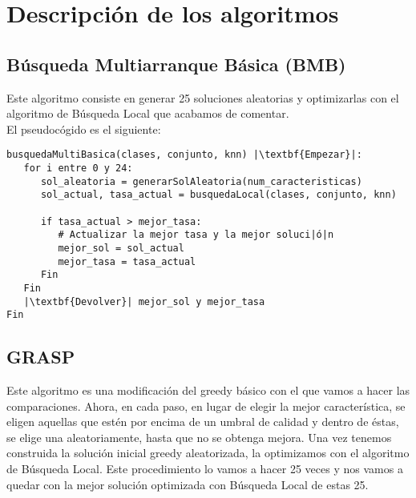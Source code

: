 \documentclass[12pt]{article}
\begin{document}
\newpage

\section{Descripción de los algoritmos}

\subsection{Búsqueda Multiarranque Básica (BMB)}

Este algoritmo consiste en generar 25 soluciones aleatorias y optimizarlas con el algoritmo de Búsqueda Local que acabamos de comentar.\\
El pseudocógido es el siguiente:
\begin{lstlisting}
busquedaMultiBasica(clases, conjunto, knn) |\textbf{Empezar}|:
   for i entre 0 y 24:
      sol_aleatoria = generarSolAleatoria(num_caracteristicas)
      sol_actual, tasa_actual = busquedaLocal(clases, conjunto, knn)
		
      if tasa_actual > mejor_tasa:
         # Actualizar la mejor tasa y la mejor soluci|ó|n
         mejor_sol = sol_actual
         mejor_tasa = tasa_actual
      Fin
   Fin
   |\textbf{Devolver}| mejor_sol y mejor_tasa
Fin
\end{lstlisting}

\subsection{GRASP}

Este algoritmo es una modificación del greedy básico con el que vamos a hacer las comparaciones. Ahora, en cada paso, en lugar de elegir la mejor característica, se eligen aquellas que estén por encima de un umbral de calidad y dentro de éstas, se elige una aleatoriamente, hasta que no se obtenga mejora. Una vez tenemos construida la solución inicial greedy aleatorizada, la optimizamos con el algoritmo de Búsqueda Local. Este procedimiento lo vamos a hacer 25 veces y nos vamos a quedar con la mejor solución optimizada con Búsqueda Local de estas 25.\\
\end{document}

